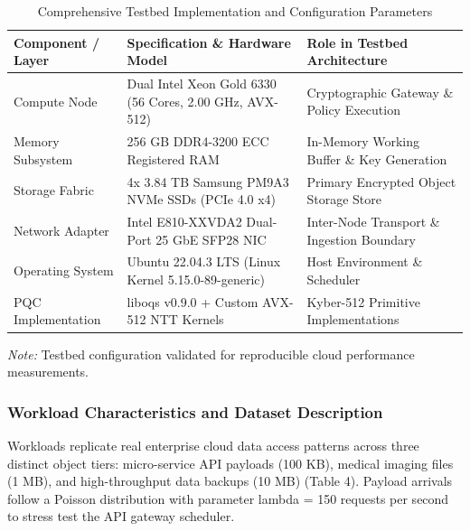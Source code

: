 \documentclass[5p,times]{elsarticle}
\begin{document}
\begin{table}[!ht]
  \centering
  \scriptsize
  \caption{Comprehensive Testbed Implementation and Configuration Parameters}
  \label{tab:3}
  \begin{tabularx}{\linewidth}{p{1.8cm}p{2.8cm}X}
    \toprule
    \textbf{Component / Layer} & \textbf{Specification \& Hardware Model} & \textbf{Role in Testbed Architecture} \\
    \midrule
    Compute Node & Dual Intel Xeon Gold 6330 (56 Cores, 2.00 GHz, AVX-512) & Cryptographic Gateway \& Policy Execution \\
    Memory Subsystem & 256 GB DDR4-3200 ECC Registered RAM & In-Memory Working Buffer \& Key Generation \\
    Storage Fabric & 4x 3.84 TB Samsung PM9A3 NVMe SSDs (PCIe 4.0 x4) & Primary Encrypted Object Storage Store \\
    Network Adapter & Intel E810-XXVDA2 Dual-Port 25 GbE SFP28 NIC & Inter-Node Transport \& Ingestion Boundary \\
    Operating System & Ubuntu 22.04.3 LTS (Linux Kernel 5.15.0-89-generic) & Host Environment \& Scheduler \\
    PQC Implementation & liboqs v0.9.0 + Custom AVX-512 NTT Kernels & Kyber-512 Primitive Implementations \\
    \bottomrule
  \end{tabularx}
  \vspace{2pt}
  \flushleft\tiny \textit{Note:} Testbed configuration validated for reproducible cloud performance measurements.
\end{table}


\subsubsection{Workload Characteristics and Dataset Description}

Workloads replicate real enterprise cloud data access patterns across three distinct object tiers: micro-service API payloads (100 KB), medical imaging files (1 MB), and high-throughput data backups (10 MB) (Table 4). Payload arrivals follow a Poisson distribution with parameter lambda = 150 requests per second to stress test the API gateway scheduler.
\end{document}
